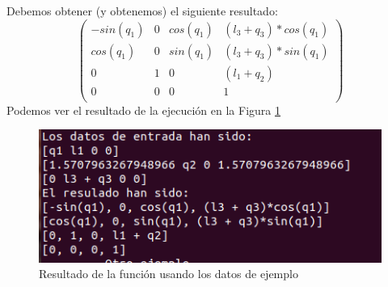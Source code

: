 \documentclass[12pt,a4paper]{report}
\begin{document}
Debemos obtener (y obtenemos) el siguiente resultado:
$$
\begin{pmatrix}
-sin(q_1) & 0 & cos(q_1)&(l_3+q_3)*cos(q_1) \\
cos(q_1) & 0 & sin(q_1)&(l_3+q_3)*sin(q_1) \\
0 & 1 & 0&(l_1+q_2) \\
0 & 0 & 0&1 \\
\end{pmatrix}
$$
Podemos ver el resultado de la ejecución en la Figura \ref{fig:ej31}
\begin{figure}[H]
	\centering
	\includegraphics{img/ej3_1}
	\caption{Resultado de la función usando los datos de ejemplo}
	\label{fig:ej31}
\end{figure}
\end{document}
